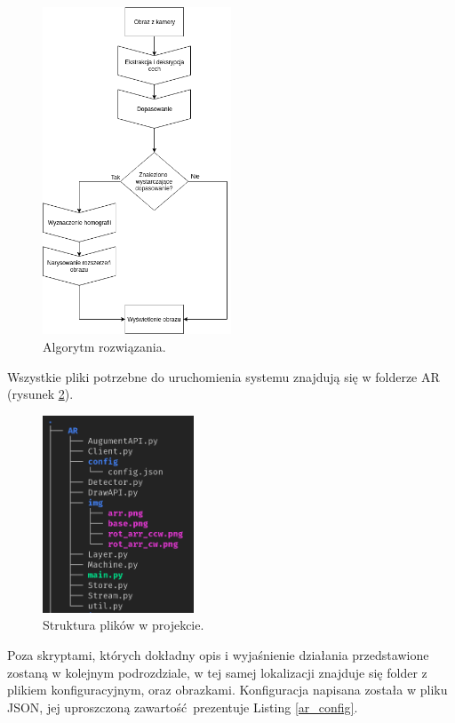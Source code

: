 \documentclass[12pt,twoside,polish]{article}
\begin{document}
\begin{figure}[h]
	\centering	
	\includegraphics[width=0.5\textwidth]{algorithm}
	\caption{Algorytm rozwiązania.}
	\label{alg}
\end{figure}

Wszystkie pliki potrzebne do uruchomienia systemu znajdują się w folderze AR (rysunek \ref{dirs_ar_ref}). 

\begin{figure}[h]
	\centering
	\includegraphics[width=0.4\textwidth]{dirs_ar}
	\caption{Struktura plików w projekcie.}
	\label{dirs_ar_ref}
\end{figure}

Poza skryptami, których dokładny opis i wyjaśnienie działania przedstawione zostaną w kolejnym podrozdziale, w tej samej lokalizacji znajduje się folder z plikiem konfiguracyjnym, oraz obrazkami. Konfiguracja napisana została w pliku JSON, jej uproszczoną zawartość prezentuje Listing \ref{ar_config}.
\end{document}
